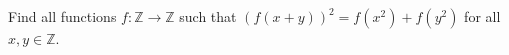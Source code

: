 \documentclass[varwidth]{standalone}
\begin{document}
    Find all functions $f: \mathbb{Z} \to \mathbb{Z}$ such that ${(f(x + y))}^2 = f\left( x^2 \right) + f\left( y^2 \right)$ for all $x, y \in \mathbb{Z}$.
\end{document}
